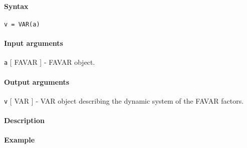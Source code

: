 


	\paragraph{Syntax}

\begin{verbatim}
v = VAR(a)
\end{verbatim}

\paragraph{Input arguments}

\texttt{a} {[} FAVAR {]} - FAVAR object.

\paragraph{Output arguments}

\texttt{v} {[} VAR {]} - VAR object describing the dynamic system of the
FAVAR factors.

\paragraph{Description}

\paragraph{Example}


